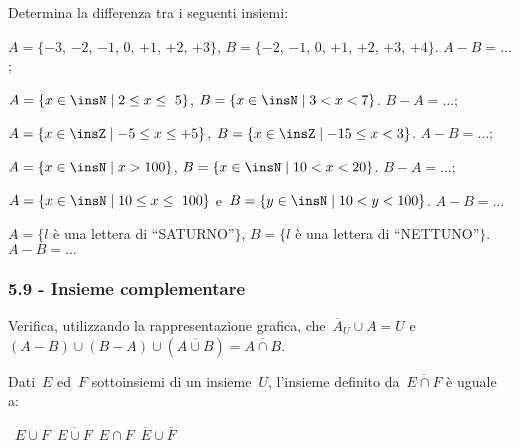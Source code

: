 \begin{esercizio}
\label{ese:5.62}
Determina la differenza tra i seguenti insiemi:
\begin{enumeratea}
\item $A=\{-3$, $-2$, $-1$, $0$, $+1$, $+2$, $+3\}$, $B=\{-2$, $-1$, $0$, $+1$, $+2$, $+3$, $+4\}$. $A-B=\ldots$;
\item $A=\{x\in\insN\mid 2\le x\le~5\}$, $B=\{x\in\insN\mid 3<x<7\}$. $B-A=\ldots$;
\item $A=\{x\in\insZ\mid -5\le x\le +5\}$, $B=\{x\in\insZ\mid -15\le x<3\}$. $A-B=\ldots$;
\item $A=\{x\in\insN\mid x>100\}$, $B=\{x\in\insN\mid 10<x<20\}$. $B-A=\ldots$;
\item $A=\{x\in\insN\mid 10\le x\le~100\}$ e~$B=\{y\in\insN\mid 10<y<100\}$. $A-B=\ldots$
\item $A=\{l$ è una lettera di ``SATURNO''$\}$, $B=\{l$ è una lettera di ``NETTUNO''$\}$. $A-B=\ldots$
\end{enumeratea}
\end{esercizio}

\subsubsection*{5.9 - Insieme complementare}
\begin{esercizio}
\label{ese:5.63}
Verifica, utilizzando la rappresentazione grafica, che~$\overline{A}_{U}\cup A=U$ e $(A-B)\cup (B-A)\cup (\overline{A\cup B})=\overline{A\cap B}$.
\end{esercizio}

\begin{esercizio}[\Ast]
 \label{ese:5.64}
Dati~$E$ ed~$F$ sottoinsiemi di un insieme~$U$, l'insieme
definito da~$\overline{E\cap F}$ è uguale a:
\begin{center}
\boxA\quad~$E\cup F$\quad\boxB\quad~$\overline{E\cup F}$\quad\boxC\quad~$E\cap F$\quad\boxD\quad~$\overline{E}\cup\overline{F}$
\end{center}
\end{esercizio}

